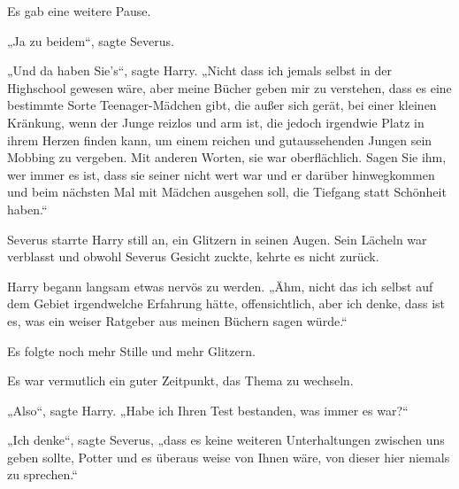 Es gab eine weitere Pause.

„Ja zu beidem“, sagte Severus.

„Und da haben Sie’s“, sagte Harry. „Nicht dass ich jemals selbst in der Highschool gewesen wäre, aber meine Bücher geben mir zu verstehen, dass es eine bestimmte Sorte Teenager-Mädchen gibt, die außer sich gerät, bei einer kleinen Kränkung, wenn der Junge reizlos und arm ist, die jedoch irgendwie Platz in ihrem Herzen finden kann, um einem reichen und gutaussehenden Jungen sein Mobbing zu vergeben. Mit anderen Worten, sie war oberflächlich. Sagen Sie ihm, wer immer es ist, dass sie seiner nicht wert war und er darüber hinwegkommen und beim nächsten Mal mit Mädchen ausgehen soll, die Tiefgang statt Schönheit haben.“

Severus starrte Harry still an, ein Glitzern in seinen Augen. Sein Lächeln war verblasst und obwohl Severus Gesicht zuckte, kehrte es nicht zurück.

Harry begann langsam etwas nervös zu werden. „Ähm, nicht das ich selbst auf dem Gebiet irgendwelche Erfahrung hätte, offensichtlich, aber ich denke, dass ist es, was ein weiser Ratgeber aus meinen Büchern sagen würde.“

Es folgte noch mehr Stille und mehr Glitzern.

Es war vermutlich ein guter Zeitpunkt, das Thema zu wechseln.

„Also“, sagte Harry. „Habe ich Ihren Test bestanden, was immer es war?“

„Ich denke“, sagte Severus, „dass es keine weiteren Unterhaltungen zwischen uns geben sollte, Potter und es überaus weise von Ihnen wäre, von dieser hier niemals zu sprechen.“


